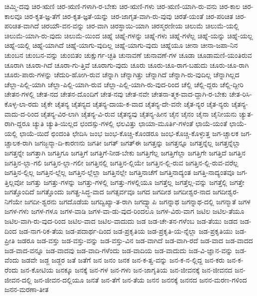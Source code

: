 {ಚಿಮ್ಮಿ-ದವು
ಚಿರ-ಋಣಿ
ಚಿರ-ಋಣಿ-ಗಳಾಗಿ-ರ-ಬೇಕು
ಚಿರ-ಋಣಿ-ಗಳು
ಚಿರ-ಋಣಿ-ಯಾಗಿ-ರು-ವನು
ಚಿರ-ಕಾಲ
ಚಿರ-ಕಾಲವೂ
ಚಿರ-ಕೃತ-ಜ್ಞ-ತೆಗೆ
ಚಿರ-ಕೃತ-ಜ್ಞತೆ-ಯನ್ನು
ಚಿರ-ಜಾಗೃತ-ವಾಗಿ-ರು-ವುವು
ಚಿರತೆ-ಯಂತೆ
ಚಿರ-ಪರಿಚಿತ
ಚಿರ-ಪರಿಚಿತ-ವಾಗಿದೆ
ಚಿರಯೌ-ವನ-ವನ್ನು
ಚಿರ-ವಾಗಿ
ಚಿರಸ್ಥಾಯಿ-ಯಾಗಿ
ಚಿರಸ್ಮರಣೀಯ
ಚಿಲುಮೆ
ಚಿಲುಮೆ-ಯಲ್ಲಿ
ಚಿಲುಮೆ-ಯಾಗಿ-ರು-ವುದು
ಚಿಲುಮೆ-ಯಿಂದ
ಚಿಹ್ನೆ
ಚಿಹ್ನೆ-ಗಳನ್ನು
ಚಿಹ್ನೆ-ಗಳು
ಚಿಹ್ನೆ-ಗಳೆಲ್ಲ
ಚಿಹ್ನೆ-ಯನ್ನು
ಚಿಹ್ನೆ-ಯಲ್ಲ
ಚಿಹ್ನೆ-ಯಲ್ಲಿ
ಚಿಹ್ನೆ-ಯಾಗಿದೆ
ಚಿಹ್ನೆ-ಯಾಗು-ವುದಿಲ್ಲ
ಚಿಹ್ನೆ-ಯಾಗು-ವುದು
ಚಿಹ್ನೆಯೂ
ಚೀನಾ
ಚೀನಾ-ಜಪಾ-ನಿನ
ಚುಂಬನ
ಚುಂಬನ-ವನ್ನು
ಚುಂಬಿತಂ
ಚುಕ್ಷುರ್ಗ-ಚ್ಛತಿ
ಚುನಾವಣೆ
ಚುನಾವಣೆ-ಗಳ
ಚೂಡಾ
ಚೂಡಾಮಣಿ-ಯಂತಿರುವ
ಚೂರಾಗಿ
ಚೂರಾ-ಗಿದೆ
ಚೂರಾ-ಗು-ತ್ತಿವೆ
ಚೂರಾಗು-ವುದು
ಚೂರು
ಚೂರು-ಚೂ-ರಾಗ-ಬಹುದು
ಚೂರು-ಚೂ-ರಾಗಿ
ಚೂರು-ಪಾರು-ಗಳನ್ನು
ಚೆದುರಿ-ಹೋಗಿ-ರುವ
ಚೆನ್ನಾಗಿ
ಚೆನ್ನಾಗಿತ್ತು
ಚೆನ್ನಾಗಿದೆ
ಚೆನ್ನಾಗಿ-ರು-ವುದಿಲ್ಲ
ಚೆನ್ನಾಗಿಲ್ಲದ
ಚೆಲ್ಲಾ-ಪಿಲ್ಲಿ-ಯಾಗಿ
ಚೆಲ್ಲಾ-ಪಿಲ್ಲಿ-ಯಾಗಿ-ರುವ
ಚೆಲ್ಲಾ-ಪಿಲ್ಲಿ-ಯಾಗಿ-ರು-ವುದ-ರಿಂದ
ಚೆಲ್ಲಿ
ಚೆಲ್ಲಿ-ದ್ದರು
ಚೆಲ್ಲಿ-ದ್ದೀರಿ
ಚೇತನ-ಗಳಲ್ಲಿ
ಚೇತ-ನದ
ಚೇತನ-ದೊಂದಿಗೆ
ಚೇತ-ನವು
ಚೇತ-ನವೇ
ಚೇತನಾ-ತ್ಮಕ-ವಾದ-ದ್ದಾಗಿ-ರ-ಬೇಕು
ಚೇತ-ರಿಸಿ-ಕೊಳ್ಳ-ಲಾ-ರದು
ಚೈಕೇ
ಚೈತನ್ಯ
ಚೈತನ್ಯದ
ಚೈತನ್ಯ-ದಾಯ-ಕ-ವಾದ
ಚೈತನ್ಯ-ದೇ-ವನೇ
ಚೈತ-ನ್ಯರ
ಚೈತ-ನ್ಯರು
ಚೈತನ್ಯ-ವಾದು-ದ-ರಿಂದ
ಚೈತನ್ಯ-ವಿರ-ಲಾಗಿ
ಚೈತನ್ಯ-ವಿ-ರುವ
ಚೈತನ್ಯವು
ಚೈತನ್ಯ-ಹೀನ
ಚೈನ
ಚೈನಂ
ಚೈನಾ
ಚೈನೀಯನು
ಚ್ಯುತ-ರಾಗಿ-ದ್ದರೂ
ಚ್ಯುತಿ
ಚ್ಯುತಿ-ಯಿಲ್ಲದ
ಛಂದಸ್ಸು-ಗಳಲ್ಲಿ
ಛಲವಿತ್ತು
ಛಾಯಾ-ಮೂರ್ತಿ-ಗಳಂತೆ
ಛಾಯೆ-ಯಂತೆ
ಛಾಯೆ-ಯಲ್ಲಿ
ಛಾಯೆ-ಯಿದೆ
ಛಿಂದಂತಿ
ಛೇದಿಸಿ
ಜಂಭ
ಜಂಭ-ಕೊಚ್ಚಿ-ಕೊಂಡರೂ
ಜಂಭ-ಕೊಚ್ಚಿ-ಕೊಳ್ಳುತ್ತ
ಜಗ-ಚ್ಚಾಲಕ
ಜಗ-ಚ್ಚಾಲಕ-ರಾಗಿ
ಜಗಜ್ಜನ್ಮಾ-ದಿ-ಕಾರಣನು
ಜಗತೀ
ಜಗತ್
ಜಗತ್ಈ
ಜಗತ್ತನ್ನು
ಜಗತ್ತನ್ನೂ
ಜಗತ್ತನ್ನೆಲ್ಲ
ಜಗತ್ತನ್ನೆಲ್ಲಾ
ಜಗತ್ತನ್ನೇ
ಜಗತ್ತಾಗಿ
ಜಗತ್ತಿಗೂ
ಜಗತ್ತಿಗೆ
ಜಗತ್ತಿಗೆ-ನೀಡ-ಬೇಕು
ಜಗತ್ತಿಗೆಲ್ಲ
ಜಗತ್ತಿಗೆಲ್ಲಾ
ಜಗತ್ತಿಗೇ
ಜಗತ್ತಿದೆ
ಜಗತ್ತಿನ
ಜಗತ್ತಿನ-ಲ್ಲಾ-ಗಲಿ
ಜಗತ್ತಿನ-ಲ್ಲಾ-ಗಲೀ
ಜಗತ್ತಿನಲ್ಲಿ
ಜಗತ್ತಿನ-ಲ್ಲಿಯೇ
ಜಗತ್ತಿನ-ಲ್ಲಿ-ರುವ
ಜಗತ್ತಿನ-ಲ್ಲಿ-ರುವ-ವರೆಲ್ಲ
ಜಗತ್ತಿನ-ಲ್ಲಿಲ್ಲ
ಜಗತ್ತಿನ-ಲ್ಲೆಲ್ಲ
ಜಗತ್ತಿನ-ಲ್ಲೆಲ್ಲಾ
ಜಗತ್ತಿನಲ್ಲೇ
ಜಗತ್ತಿನಾಚೆಗೆ
ಜಗತ್ತಿನಾದ್ಯಂತ
ಜಗತ್ತಿ-ನಾದ್ಯಂತವೂ
ಜಗ-ತ್ತಿಲ್ಲವೋ
ಜಗತ್ತು
ಜಗತ್ತು-ಗಳನ್ನು
ಜಗತ್ತು-ಗಳಲ್ಲಿ
ಜಗತ್ತು-ಗಳಲ್ಲಿಯೂ
ಜಗತ್ತೆಲ್ಲ
ಜಗತ್ತೆಲ್ಲ-ವನ್ನು
ಜಗತ್ತೆಲ್ಲಿ
ಜಗತ್ತೇ
ಜಗತ್ತೊಂದಿದೆ
ಜಗತ್ತೊಂದು
ಜಗತ್ಪ್ರ-ಸಿದ್ಧ-ವಾದ
ಜಗತ್ಸರ್ವವೂ
ಜಗದ
ಜಗದೀಶ
ಜಗದೀಶ್ವರ-ನಾದ
ಜಗದೀಶ್ವರ-ನಿಗೆಯೇ
ಜಗದೀ-ಶ್ವರನು
ಜಗದೊಡೆಯ
ಜಗದ್ವಿಖ್ಯಾ-ತ-ರಾಗಿ
ಜಗದ್ವ್ಯಾಪಿ
ಜಗನ್ನಾಥ
ಜಗನ್ನಾಥ-ದಲ್ಲಿ
ಜಗನ್ಮಾತೆ
ಜಗಳ
ಜಗಳ-ಗಳು
ಜಗಳ-ಗಳೂ
ಜಗಳ-ವಾಡಿ
ಜಗಳ-ವಾ-ಡು-ವುದ-ರಿಂದಲೂ
ಜಗಳ-ವಿರು-ವಾಗ
ಜಟಿಲ
ಜಟಿಲ-ತೆಯೂ
ಜಟಿಲ-ವಾಗಿ-ರು-ವುದ-ರಿಂದ
ಜಟಿಲ-ವಾದ
ಜಟಿಲ-ವಾದುದು
ಜಡ
ಜಡ-ಚೇ-ತನ-ಗಳೆಂಬ
ಜಡ-ತೆಯು
ಜಡದ
ಜಡ-ದಿಂದ
ಜಡ-ನಾಗ-ರಿಕ-ತೆಯ
ಜಡ-ಪದಾರ್ಥ-ದಿಂದ
ಜಡ-ಪ್ರಕೃತಿಯ
ಜಡ-ಪ್ರಕೃತಿ-ಯ-ನ್ನೆಲ್ಲಾ
ಜಡ-ಪ್ರಕೃತಿಯು
ಜಡ-ಪ್ರೀತಿ
ಜಡರೂ
ಜಡ-ವಸ್ತು
ಜಡ-ವಸ್ತು-ವನ್ನು
ಜಡ-ವಸ್ತು-ವಿನ
ಜಡ-ವಾಗಿದೆ
ಜಡ-ವಾಗಿ-ರದೆ
ಜಡ-ವಾದ
ಜಡ-ವಾದದ
ಜಡ-ವಾದ-ವನ್ನೂ
ಜಡ-ವಾದವು
ಜಡ-ವಾದಿ-ಗಳೆಂದು
ಜಡ-ವಾದಿಯ
ಜಡ-ವಾದುದು
ಜಡ-ವಿ-ಜ್ಞಾನ-ವನ್ನು
ಜಡ-ವೆಂದು
ಜಡವೇ
ಜಡ್ಜ
ಜಡ್ಜರ
ಜತೆ
ಜತೆಗೆ
ಜನ
ಜನಂ
ಜನಕ
ಜನ-ಕ-ತ್ವ-ವನ್ನು
ಜನ-ಕ-ನ-ಲ್ಲಿದ್ದ
ಜನ-ಕರು
ಜನ-ಕ-ರೆಂದು
ಜನ-ಕೋಟಿಯ
ಜನಕ್ಕೂ
ಜನಕ್ಕೆ
ಜನ-ಗಳ
ಜನ-ಗಳು
ಜನ-ಜಾಗೃತಿಯ
ಜನ-ಜೀವನಕ್ಕೆ
ಜನ-ಜೀವನದ
ಜನ-ಜೀವನ-ದಲ್ಲಿ
ಜನ-ಜೀವನ-ದಲ್ಲಿಯೂ
ಜನತೆ
ಜನ-ತೆಗೆ
ಜನ-ತೆಯ
ಜನನ
ಜನನಕ್ಕೆ
ಜನನದ
ಜನನ-ಮರಣ-ಗಳಿಂದ
ಜನನ-ಮರಣಾ-ತೀತ
}
